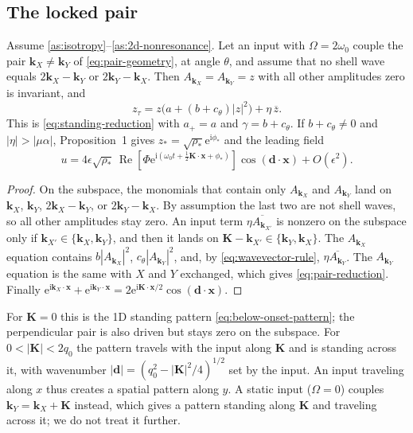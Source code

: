 \documentclass[11pt]{article}
\newcommand{\ii}{\mathrm{i}}
\newcommand{\ee}{\mathrm{e}}
\DeclareMathOperator{\RePart}{Re}
\begin{document}
\subsection{The locked pair}
\begin{proposition}
Assume \ref{as:isotropy}--\ref{as:2d-nonresonance}. Let an input with
$\Omega=2\omega_0$ couple the pair $\boldsymbol k_X\neq\boldsymbol k_Y$ of
\eqref{eq:pair-geometry}, at angle $\theta$, and assume that no shell wave
equals $2\boldsymbol k_X-\boldsymbol k_Y$ or $2\boldsymbol k_Y-\boldsymbol k_X$.
Then $A_{\boldsymbol k_X}=A_{\boldsymbol k_Y}=z$ with all other amplitudes zero
is invariant, and
\begin{equation}
 z_\tau=z\bigl(a+(b+c_\theta)|z|^2\bigr)+\eta\,\overline z .
 \label{eq:pair-reduction}
\end{equation}
This is \eqref{eq:standing-reduction} with $a_+=a$ and $\gamma=b+c_\theta$.
If $b+c_\theta\neq0$ and $|\eta|>|\mu\alpha|$, Proposition~1 gives
$z_*=\sqrt{\rho_*}\ee^{\ii\phi_*}$
and the leading field
\begin{equation}
 \boxed{u=4\epsilon\sqrt{\rho_*}\,
 \RePart\!\left[\Phi\ee^{\ii(\omega_0t+\frac12\boldsymbol K\cdot\boldsymbol x+\phi_*)}\right]
 \cos(\boldsymbol d\cdot\boldsymbol x)+O(\epsilon^2).}
 \label{eq:pair-field}
\end{equation}
\end{proposition}
\begin{proof}
On the subspace, the monomials that contain only $A_{\boldsymbol k_X}$ and
$A_{\boldsymbol k_Y}$ land on $\boldsymbol k_X$, $\boldsymbol k_Y$,
$2\boldsymbol k_X-\boldsymbol k_Y$, or $2\boldsymbol k_Y-\boldsymbol k_X$. By
assumption the last two are not shell waves, so all other amplitudes stay
zero. An input term $\eta\overline{A_{\boldsymbol k_{X'}}}$ is nonzero on the
subspace only if $\boldsymbol k_{X'}\in\{\boldsymbol k_X,\boldsymbol k_Y\}$, and
then it lands on $\boldsymbol K-\boldsymbol k_{X'}\in\{\boldsymbol k_Y,\boldsymbol k_X\}$.
The $A_{\boldsymbol k_X}$ equation contains
$b|A_{\boldsymbol k_X}|^2$, $c_\theta|A_{\boldsymbol k_Y}|^2$, and, by
\eqref{eq:wavevector-rule}, $\eta\overline{A_{\boldsymbol k_Y}}$. The
$A_{\boldsymbol k_Y}$ equation is the same with $X$ and $Y$ exchanged, which
gives \eqref{eq:pair-reduction}. Finally
$\ee^{\ii\boldsymbol k_X\cdot\boldsymbol x}+\ee^{\ii\boldsymbol k_Y\cdot\boldsymbol x}
=2\ee^{\ii\boldsymbol K\cdot\boldsymbol x/2}\cos(\boldsymbol d\cdot\boldsymbol x)$.
\end{proof}
For $\boldsymbol K=0$ this is the 1D standing pattern \eqref{eq:below-onset-pattern};
the perpendicular pair is also driven but stays zero on the subspace.
For $0<|\boldsymbol K|<2q_0$ the pattern travels with the input along
$\boldsymbol K$ and is standing across it, with wavenumber
$|\boldsymbol d|=(q_0^2-|\boldsymbol K|^2/4)^{1/2}$ set by the input. An
input traveling along $x$ thus creates a spatial pattern along $y$. A static
input ($\Omega=0$) couples $\boldsymbol k_Y=\boldsymbol k_X+\boldsymbol K$
instead, which gives a pattern standing along $\boldsymbol K$ and traveling
across it; we do not treat it further.
\end{document}
